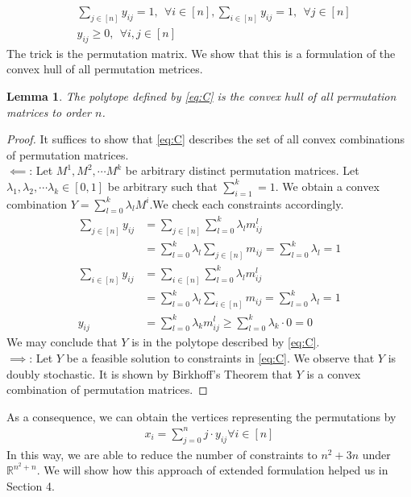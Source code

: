 \documentclass[12pt,letterpaper]{article}
\newcommand*{\R}{\mathbb{R}}
\newtheorem{lemma}[theorem]{Lemma}
\begin{document}
\begin{align}
    &\sum_{j \in [n]} y_{ij} = 1, \ \ \forall i \in [n], \sum_{i \in [n]} y_{ij} = 1, \ \ \forall j \in[n] \label{eq:C} \tag{B} \\ 
    &y_{ij} \geq 0, \ \ \forall i, j \in [n] \nonumber 
\end{align}
The trick is the permutation matrix. We show that this is a formulation of the 
convex hull of all permutation metrices.
\begin{lemma}
    The polytope defined by \ref{eq:C} is the convex hull of all permutation matrices to order $n$.
\end{lemma}
\begin{proof}
    It suffices to show that \ref{eq:C} describes the set of all convex combinations of permutation matrices. \\
    $\impliedby$: Let $M^1, M^2, \cdots M^k$ be arbitrary distinct permutation matrices. Let $\lambda_1, \lambda_2, \cdots \lambda_k \in [0, 1]$ be arbitrary
    such that $\sum_{i=1}^k = 1$.
    We obtain a convex combination $Y = \sum_{l = 0}^k \lambda_l M^i$.We check each constraints accordingly. 
    \begin{align*}
    \sum_{j \in [n]} y_{ij} &= \sum_{j \in [n]} \sum_{l = 0}^k \lambda_l m_{ij}^l \\
    &= \sum_{l = 0}^k \lambda_l \sum_{j \in [n]} m_{ij} = \sum_{l = 0}^k \lambda_l = 1 \\ 
    \sum_{i \in [n]} y_{ij} &= \sum_{i \in [n]} \sum_{l = 0}^k \lambda_l m_{ij}^l \\
    &= \sum_{l = 0}^k \lambda_l \sum_{i \in [n]} m_{ij} = \sum_{l = 0}^k \lambda_l = 1 \\ 
    y_{ij} &= \sum_{l = 0}^k \lambda_k m_{ij}^l \geq \sum_{l = 0}^k \lambda_k \cdot 0  = 0 
    \end{align*}
    We may conclude that $Y$ is in the polytope described by \ref{eq:C}. \\
    $\implies$: Let $Y$ be a feasible solution to constraints in \ref{eq:C}. 
    We observe that $Y$ is doubly stochastic. It is shown by Birkhoff's Theorem \cite{jurkat1967term} that 
    $Y$ is a convex combination of permutation matrices. 
\end{proof}

As a consequence, we can obtain the vertices representing the permutations by 
\begin{align*}
    x_i = \sum_{j = 0}^n j \cdot y_{ij} \forall i \in[n]
\end{align*}
In this way, we are able to reduce the number of constraints to $n^2 + 3n$ under $\R^{n^2 + n}$.
We will show how this approach of extended formulation helped us in Section 4. 
\end{document}
